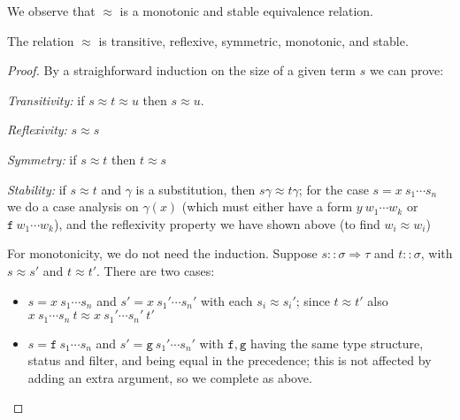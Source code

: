 \documentclass[a4paper,USenglish,cleveref,autoref,thm-restate]{lipics-v2021}
\newcommand{\arrtype}{\Rightarrow}
\newcommand{\ismain}{\approx}
\newcommand{\eqpred}{\equiv}
\newcommand{\symb}[1]{\mathtt{#1}}
\newcommand{\afun}{\symb{f}}
\newcommand{\bfun}{\symb{g}}
\newcommand{\cfun}{\symb{h}}
\newcommand{\atype}{\sigma}
\newcommand{\btype}{\tau}
\newcommand{\filter}{\pi}
\begin{document}
We observe that $\ismain$ is a monotonic and stable equivalence relation.

\begin{lemma}\label{lem:ismain}
The relation $\ismain$ is transitive, reflexive, symmetric, monotonic, and stable.
\end{lemma}

\begin{proof}
By a straighforward induction on the size of a given term $s$ we can prove:

\emph{Transitivity:}
if $s \ismain t \ismain u$ then $s \ismain u$.

\emph{Reflexivity:} $s \ismain s$

\emph{Symmetry:} if $s \ismain t$ then $t \ismain s$

\emph{Stability:} if $s \ismain t$ and $\gamma$ is a substitution, then $s\gamma \ismain t\gamma$;
  for the case $s = x\ s_1 \cdots s_n$ we do a case analysis on $\gamma(x)$ (which must either have
  a form $y\ w_1 \cdots w_k$ or $\afun\ w_1 \cdots w_k$), and the reflexivity property we have
  shown above (to find $w_i \ismain w_i$)

For monotonicity, we do not need the induction.  Suppose $s :: \atype \arrtype \btype$ and $t ::
\atype$, with $s \ismain s'$ and $t \ismain t'$.  There are two cases:
\begin{itemize}
\item $s = x\ s_1 \cdots s_n$ and $s' = x\ s_1' \cdots s_n'$ with each $s_i \ismain s_i'$; since
  $t \ismain t'$ also $x\ s_1 \cdots s_n\ t \ismain x\ s_1' \cdots s_n'\ t'$
\item $s = \afun\ s_1 \cdots s_n$ and $s' = \bfun\ s_1' \cdots s_n'$ with $\afun,\bfun$ having the
  same type structure, status and filter, and being equal in the precedence; this is not
  affected by adding an extra argument, so we complete as above.
  \qedhere
\end{itemize}
\end{proof}
\end{document}
